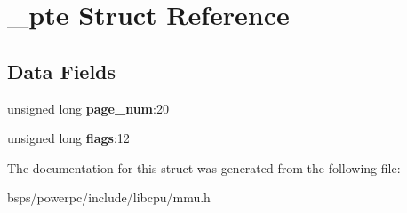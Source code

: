 \hypertarget{struct__pte}{}\section{\+\_\+pte Struct Reference}
\label{struct__pte}
\subsection*{Data Fields}
\begin{DoxyCompactItemize}
\item 
\mbox{\label{struct__pte_aea639ba732aeb8f28989d1c9f716824e}} 
unsigned long {\bfseries page\+\_\+num}\+:20
\item 
\mbox{\label{struct__pte_a1a745d02ceae171948dad13717eaa87f}} 
unsigned long {\bfseries flags}\+:12
\end{DoxyCompactItemize}


The documentation for this struct was generated from the following file\+:\begin{DoxyCompactItemize}
\item 
bsps/powerpc/include/libcpu/mmu.\+h\end{DoxyCompactItemize}

